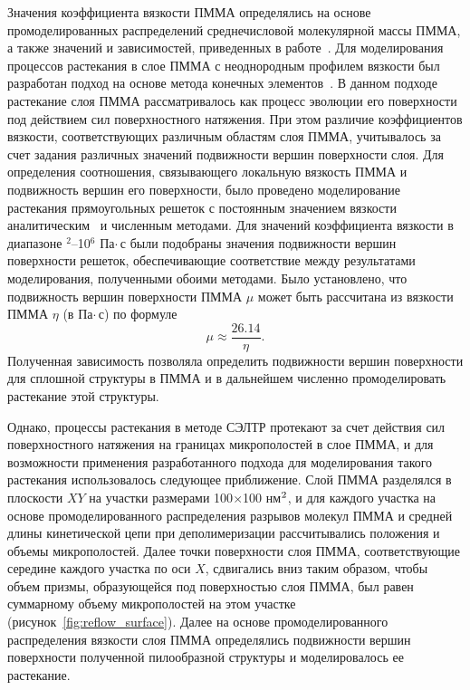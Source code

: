 Значения коэффициента вязкости ПММА определялись на основе промоделированных распределений среднечисловой молекулярной массы ПММА, а также значений и зависимостей, приведенных в работе~\cite{Leveder_2010}.
Для моделирования процессов растекания в слое ПММА с неоднородным профилем вязкости был разработан подход на основе метода конечных элементов~\cite{Brakke_SE}.
В данном подходе растекание слоя ПММА рассматривалось как процесс эволюции его поверхности под действием сил поверхностного натяжения. При этом различие коэффициентов вязкости, соответствующих различным областям слоя \linebreak ПММА, учитывалось за счет задания различных значений подвижности вершин поверхности слоя.
Для определения соотношения, связывающего локальную вязкость ПММА и подвижность вершин его поверхности, было проведено моделирование растекания прямоугольных решеток с постоянным значением вязкости аналитическим~\cite{Leveder_2010} и численным методами. Для значений коэффициента вязкости в диапазоне $^{\text{2}}$--10$^{\text{6}}$ Па\:$\cdot$\,с были подобраны значения подвижности вершин поверхности решеток, обеспечивающие соответствие между результатами моделирования, полученными обоими методами. Было установлено, что подвижность вершин поверхности \linebreak ПММА $\mu$ может быть рассчитана из вязкости ПММА $\eta$ (в Па\:$\cdot$\,с) по формуле
\begin{equation}
	\mu \approx \frac{26.14}{\eta}.
\end{equation}
Полученная зависимость позволяла определить подвижности вершин поверхности для сплошной структуры в ПММА и в дальнейшем численно промоделировать растекание этой структуры.

Однако, процессы растекания в методе СЭЛТР протекают за счет действия сил поверхностного натяжения на границах микрополостей в слое ПММА, и для возможности применения разработанного подхода для моделирования такого растекания использовалось следующее приближение.
Слой ПММА разделялся в плоскости $XY$ на участки размерами 100$\times$100 нм$^\text{2}$, и для каждого участка на основе промоделированного распределения разрывов молекул ПММА и средней длины кинетической цепи при деполимеризации рассчитывались положения и объемы микрополостей.
Далее точки поверхности слоя ПММА, соответствующие середине каждого участка по оси $X$, сдвигались вниз таким образом, чтобы объем призмы, образующейся под поверхностью слоя ПММА, был равен суммарному объему микрополостей на этом участке (рисунок~\ref{fig:reflow_surface}).
Далее на основе промоделированного распределения вязкости слоя ПММА определялись подвижности вершин поверхности полученной пилообразной структуры и моделировалось ее растекание.

